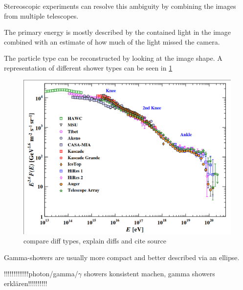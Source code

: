 Stereoscopic experiments can resolve this ambiguity by combining the images from 
multiple telescopes.


The primary energy is mostly described by the contained light in the image combined with 
an estimate of how much of the light missed the camera. 


The particle type can be reconstructed 
by looking at the image shape.
A representation of different shower types can be seen in \ref{fig:compare_showers}

\begin{figure}
	\includegraphics[width=.8\textwidth]{images/cr_spectrum.png}
	\caption{compare diff types, explain diffs  and cite source}
	\label{fig:compare_showers}
\end{figure}

Gamma-showers are usually more compact and better described via an ellipse.








!!!!!!!!!!!!!photon/gamma/$\gamma$ showers konsistent machen, gamma showers erklären!!!!!!!!!!

